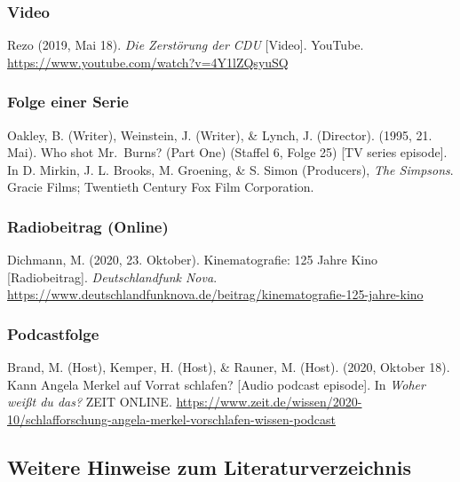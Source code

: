 \documentclass[
  letterpaper,
  DIV=11]{scrreprt}
\begin{document}
\subsubsection{Video}\label{video}

Rezo (2019, Mai 18). \emph{Die Zerstörung der CDU} {[}Video{]}. YouTube.
\url{https://www.youtube.com/watch?v=4Y1lZQsyuSQ}

\subsubsection{Folge einer Serie}\label{folge-einer-serie}

Oakley, B. (Writer), Weinstein, J. (Writer), \& Lynch, J. (Director).
(1995, 21. Mai). Who shot Mr.~Burns? (Part One) (Staffel 6, Folge 25)
{[}TV series episode{]}. In D. Mirkin, J. L. Brooks, M. Groening, \& S.
Simon (Producers), \emph{The Simpsons}. Gracie Films; Twentieth Century
Fox Film Corporation.

\subsubsection{Radiobeitrag (Online)}\label{radiobeitrag-online}

Dichmann, M. (2020, 23. Oktober). Kinematografie: 125 Jahre Kino
{[}Radiobeitrag{]}. \emph{Deutschlandfunk Nova}.
\url{https://www.deutschlandfunknova.de/beitrag/kinematografie-125-jahre-kino}

\subsubsection{Podcastfolge}\label{podcastfolge}

Brand, M. (Host), Kemper, H. (Host), \& Rauner, M. (Host). (2020,
Oktober 18). Kann Angela Merkel auf Vorrat schlafen? {[}Audio podcast
episode{]}. In \emph{Woher weißt du das?} ZEIT ONLINE.
\url{https://www.zeit.de/wissen/2020-10/schlafforschung-angela-merkel-vorschlafen-wissen-podcast}

\subsection{Weitere Hinweise zum
Literaturverzeichnis}\label{weitere-hinweise-zum-literaturverzeichnis}
\end{document}

